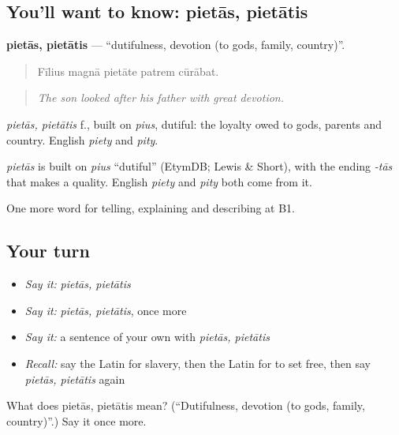 \subsection*{You'll want to know: pietās, pietātis}
\textbf{pietās, pietātis} — \textquotedblleft{}dutifulness, devotion (to gods, family, country)\textquotedblright{}.

\begin{quote}
Fīlius magnā pietāte patrem cūrābat.
\end{quote}

\begin{quote}
\emph{The son looked after his father with great devotion.}
\end{quote}

\emph{pietās, pietātis} f., built on \emph{pius}, dutiful: the loyalty owed to gods, parents and country. English \emph{piety} and \emph{pity}.

\begin{cousinweb}
\emph{pietās} is built on \emph{pius} \textquotedblleft{}dutiful\textquotedblright{} (EtymDB; Lewis \& Short), with the ending \emph{-tās} that makes a quality. English \emph{piety} and \emph{pity} both come from it.
\end{cousinweb}

\begin{grammarlens}[title={What you've built}]
One more word for telling, explaining and describing at B1.
\end{grammarlens}

\subsection*{Your turn}
\begin{itemize}
\raggedright
  \item \emph{Say it:} \emph{pietās, pietātis}
  \item \emph{Say it:} \emph{pietās, pietātis}, once more
  \item \emph{Say it:} a sentence of your own with \emph{pietās, pietātis}
  \item \emph{Recall:} say the Latin for slavery, then the Latin for to set free, then say \emph{pietās, pietātis} again
\end{itemize}

\begin{tcolorbox}[breakable,colback=teal!4,colframe=teal!35!black,title={Before you move on}]
What does pietās, pietātis mean? (\textquotedblleft{}Dutifulness, devotion (to gods, family, country)\textquotedblright{}.) Say it once more.
\end{tcolorbox}
